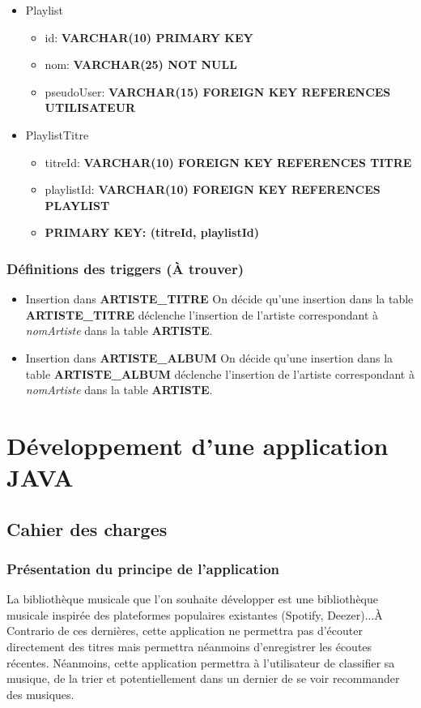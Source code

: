 \documentclass[a4paper,10pt, french]{report}
\begin{document}
\begin{itemize}
\begin{itemize}
        \end{itemize}
      \item Playlist
        \begin{itemize}
          \item id: \textbf{VARCHAR(10) PRIMARY KEY}
          \item nom: \textbf{VARCHAR(25) NOT NULL}
          \item pseudoUser: \textbf{VARCHAR(15) FOREIGN KEY REFERENCES UTILISATEUR}
        \end{itemize}
      \item PlaylistTitre
        \begin{itemize}
          \item titreId: \textbf{VARCHAR(10) FOREIGN KEY REFERENCES TITRE}
          \item playlistId: \textbf{VARCHAR(10) FOREIGN KEY REFERENCES PLAYLIST}
          \item \textbf{PRIMARY KEY: (titreId, playlistId)}
        \end{itemize}
      \end{itemize}
  \subsection{Définitions des triggers (À trouver)}
    \begin{itemize}
      \item Insertion dans \textbf{ARTISTE\_TITRE} \newline
        On décide qu'une insertion dans la table \textbf{ARTISTE\_TITRE} déclenche l'insertion de l'artiste correspondant à \emph{nomArtiste} dans la table \textbf{ARTISTE}.
      \item Insertion dans \textbf{ARTISTE\_ALBUM} \newline
        On décide qu'une insertion dans la table \textbf{ARTISTE\_ALBUM} déclenche l'insertion de l'artiste correspondant à \emph{nomArtiste} dans la table \textbf{ARTISTE}.
    \end{itemize}

\chapter{Développement d'une application JAVA}
\section{Cahier des charges}
  \subsection{Présentation du principe de l'application}
    La bibliothèque musicale que l'on souhaite développer est une bibliothèque musicale inspirée des plateformes populaires existantes (Spotify, Deezer)...À Contrario de ces dernières, cette application ne permettra pas d'écouter directement des titres mais permettra néanmoins d'enregistrer les écoutes récentes. Néanmoins, cette application permettra à l'utilisateur de classifier sa musique, de la trier et potentiellement dans un dernier de se voir recommander des musiques.
\end{document}
